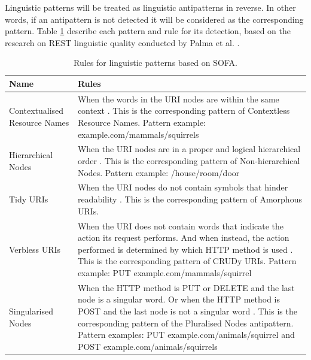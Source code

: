 Linguistic patterns will be treated as linguistic antipatterns in reverse. In other words, if an antipattern is not detected it will be considered as the corresponding  pattern. Table \ref{tab:Rulesforlinguisticpatterns} describe each pattern and rule for its detection, based on the research on REST linguistic quality conducted by Palma et al. \cite{linguistic}.

\begin{center}
\begin{table}[!ht]
\small
\begin{tabular}{|p{30mm}|p{105mm}|}
\hline \textbf{Name} & \textbf{Rules} \\
\hline 
Contextualised Resource Names &
When the words in the URI nodes are within the same context \cite{linguistic}. This is the corresponding pattern of Contextless Resource Names. \newline Pattern example: 
example.com/mammals/squirrels\\ \hline
Hierarchical Nodes &
When the URI nodes are in a proper and logical hierarchical order \cite{linguistic}. This is the corresponding pattern of Non-hierarchical Nodes. \newline Pattern example: /house/room/door\\ \hline
Tidy URIs &
When the URI nodes do not contain symbols that hinder readability \cite{linguistic}. This is the corresponding pattern of Amorphous URIs.\\ \hline
Verbless URIs &
When the URI does not contain words that indicate the action its request performs. And when instead, the action performed is determined by which HTTP method is used \cite{linguistic}. This is the corresponding pattern of CRUDy URIs. \newline Pattern example: 
PUT example.com/mammals/squirrel\\ \hline
Singularised Nodes
&
When the HTTP method is PUT or DELETE and the last node is a singular word. Or when the HTTP method is POST and the last node is not a singular word \cite{linguistic}. This is the corresponding pattern of the Pluralised Nodes antipattern. \newline Pattern examples: PUT example.com/animals/squirrel and POST example.com/animals/squirrels\\ \hline
\end{tabular}
 \caption{Rules for linguistic patterns based on SOFA.}
 \label{tab:Rulesforlinguisticpatterns}
\end{table}
\end{center}

